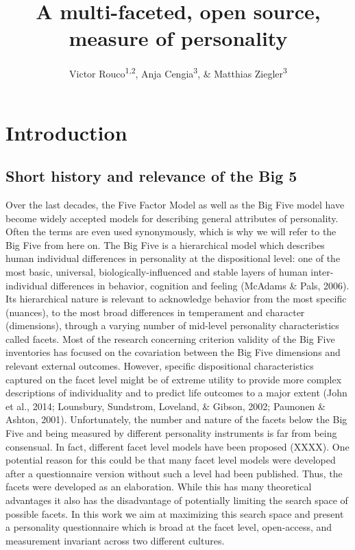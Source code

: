 \documentclass[,man]{apa6}
\title{A multi-faceted, open source, measure of personality}
\author{Victor Rouco\textsuperscript{1,2}, Anja Cengia\textsuperscript{3}, \&
Matthias Ziegler\textsuperscript{3}}
\date{}
\affiliation{
\vspace{0.5cm}
\textsuperscript{1} Universitat de Barcelona\\\textsuperscript{2} Institut de Neurociencies Barcelona\\\textsuperscript{3} Humboldt Universität zu Berlin}
\theoremstyle{definition}
\theoremstyle{definition}
\theoremstyle{definition}
\theoremstyle{remark}
\begin{document}
\maketitle

\hypertarget{introduction}{%
\section{Introduction}\label{introduction}}

\hypertarget{short-history-and-relevance-of-the-big-5}{%
\subsection{Short history and relevance of the Big
5}\label{short-history-and-relevance-of-the-big-5}}

Over the last decades, the Five Factor Model as well as the Big Five
model have become widely accepted models for describing general
attributes of personality. Often the terms are even used synonymously,
which is why we will refer to the Big Five from here on. The Big Five is
a hierarchical model which describes human individual differences in
personality at the dispositional level: one of the most basic,
universal, biologically-influenced and stable layers of human
inter-individual differences in behavior, cognition and feeling (McAdams
\& Pals, 2006). Its hierarchical nature is relevant to acknowledge
behavior from the most specific (nuances), to the most broad differences
in temperament and character (dimensions), through a varying number of
mid-level personality characteristics called facets. Most of the
research concerning criterion validity of the Big Five inventories has
focused on the covariation between the Big Five dimensions and relevant
external outcomes. However, specific dispositional characteristics
captured on the facet level might be of extreme utility to provide more
complex descriptions of individuality and to predict life outcomes to a
major extent (John et al., 2014; Lounsbury, Sundstrom, Loveland, \&
Gibson, 2002; Paunonen \& Ashton, 2001). Unfortunately, the number and
nature of the facets below the Big Five and being measured by different
personality instruments is far from being consensual. In fact, different
facet level models have been proposed (XXXX). One potential reason for
this could be that many facet level models were developed after a
questionnaire version without such a level had been published. Thus, the
facets were developed as an elaboration. While this has many theoretical
advantages it also has the disadvantage of potentially limiting the
search space of possible facets. In this work we aim at maximizing this
search space and present a personality questionnaire which is broad at
the facet level, open-access, and measurement invariant across two
different cultures.
\end{document}
